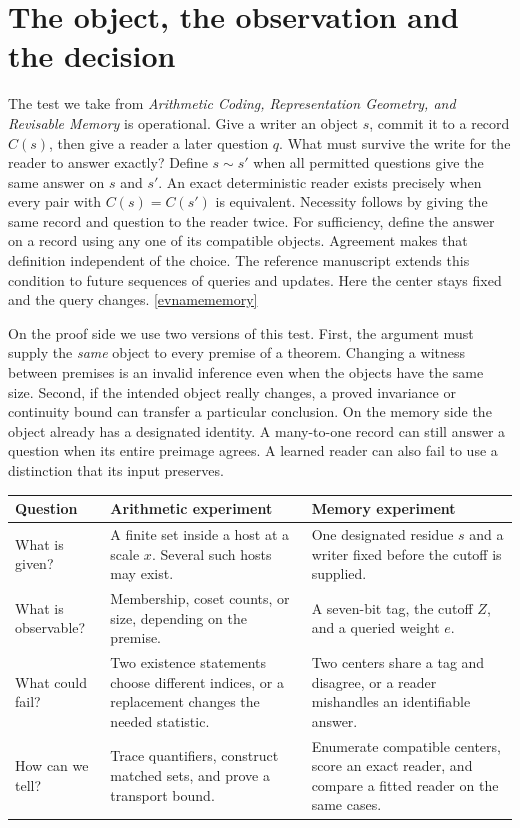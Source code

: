 \documentclass[11pt,letterpaper]{article}
\newcommand{\evref}[1]{\hyperlink{ev-#1}{\textsf{\small[\csname evname#1\endcsname]}}}
\begin{document}
\section{The object, the observation and the decision}
\label{sec:objects}

The test we take from \emph{Arithmetic Coding, Representation Geometry, and Revisable Memory} is operational. Give a writer an object \(s\), commit it to a record \(C(s)\), then give a reader a later question \(q\). What must survive the write for the reader to answer exactly? Define \(s\sim s'\) when all permitted questions give the same answer on \(s\) and \(s'\). An exact deterministic reader exists precisely when every pair with \(C(s)=C(s')\) is equivalent. Necessity follows by giving the same record and question to the reader twice. For sufficiency, define the answer on a record using any one of its compatible objects. Agreement makes that definition independent of the choice. The reference manuscript extends this condition to future sequences of queries and updates. Here the center stays fixed and the query changes. \evref{memory}

On the proof side we use two versions of this test. First, the argument must supply the \emph{same} object to every premise of a theorem. Changing a witness between premises is an invalid inference even when the objects have the same size. Second, if the intended object really changes, a proved invariance or continuity bound can transfer a particular conclusion. On the memory side the object already has a designated identity. A many-to-one record can still answer a question when its entire preimage agrees. A learned reader can also fail to use a distinction that its input preserves.

\begin{center}\small
\begin{tabularx}{\linewidth}{@{}p{.19\linewidth}YY@{}}
\toprule
Question & Arithmetic experiment & Memory experiment\\ \midrule
What is given? & A finite set inside a host at a scale \(x\). Several such hosts may exist. & One designated residue \(s\) and a writer fixed before the cutoff is supplied.\\
What is observable? & Membership, coset counts, or size, depending on the premise. & A seven-bit tag, the cutoff \(Z\), and a queried weight \(e\).\\
What could fail? & Two existence statements choose different indices, or a replacement changes the needed statistic. & Two centers share a tag and disagree, or a reader mishandles an identifiable answer.\\
How can we tell? & Trace quantifiers, construct matched sets, and prove a transport bound. & Enumerate compatible centers, score an exact reader, and compare a fitted reader on the same cases.\\
\bottomrule
\end{tabularx}
\end{center}
\end{document}
